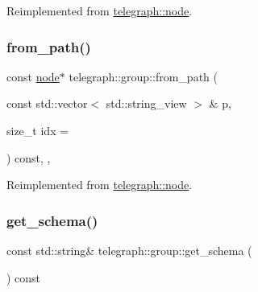 Reimplemented from \hyperlink{classtelegraph_1_1node_a2d5ea5366a04f3b3841de9bc21e70416}{telegraph\+::node}.

\mbox{\label{classtelegraph_1_1group_ad4ed6177fee328ec3702d01a881a33ee}} 
\subsubsection{\texorpdfstring{from\+\_\+path()}{from\_path()}\hspace{0.1cm}{\footnotesize\ttfamily [2/2]}}
{\footnotesize\ttfamily const \hyperlink{classtelegraph_1_1node}{node}$\ast$ telegraph\+::group\+::from\+\_\+path (\begin{DoxyParamCaption}\item[{const std\+::vector$<$ std\+::string\+\_\+view $>$ \&}]{p,  }\item[{size\+\_\+t}]{idx = {} }\end{DoxyParamCaption}) const\hspace{0.3cm}{\ttfamily [inline]}, {\ttfamily [override]}, {\ttfamily [virtual]}}



Reimplemented from \hyperlink{classtelegraph_1_1node_aaba33e2aa28a99dcd8f4b1888c3a5706}{telegraph\+::node}.

\mbox{\label{classtelegraph_1_1group_a6ab1978bc6c97d3dcd802665c92390b8}} 
\subsubsection{\texorpdfstring{get\+\_\+schema()}{get\_schema()}}
{\footnotesize\ttfamily const std\+::string\& telegraph\+::group\+::get\+\_\+schema (\begin{DoxyParamCaption}{ }\end{DoxyParamCaption}) const\hspace{0.3cm}{\ttfamily [inline]}}

\mbox{\label{classtelegraph_1_1group_a04e3ffe2ee3b18f0c2d921bdd8b0789f}} 
